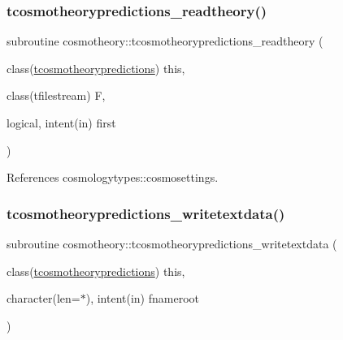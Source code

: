 \mbox{\label{namespacecosmotheory_aef1a661d37d1e130bced884acc9ea1bd}} 
\subsubsection{\texorpdfstring{tcosmotheorypredictions\+\_\+readtheory()}{tcosmotheorypredictions\_readtheory()}}
{\footnotesize\ttfamily subroutine cosmotheory\+::tcosmotheorypredictions\+\_\+readtheory (\begin{DoxyParamCaption}\item[{class(\mbox{\hyperlink{structcosmotheory_1_1tcosmotheorypredictions}{tcosmotheorypredictions}})}]{this,  }\item[{class(tfilestream)}]{F,  }\item[{logical, intent(in)}]{first }\end{DoxyParamCaption})\hspace{0.3cm}{\ttfamily [private]}}



References cosmologytypes\+::cosmosettings.

\mbox{\label{namespacecosmotheory_a10b74bbd756437c4b81eb4130afae354}} 
\subsubsection{\texorpdfstring{tcosmotheorypredictions\+\_\+writetextdata()}{tcosmotheorypredictions\_writetextdata()}}
{\footnotesize\ttfamily subroutine cosmotheory\+::tcosmotheorypredictions\+\_\+writetextdata (\begin{DoxyParamCaption}\item[{class(\mbox{\hyperlink{structcosmotheory_1_1tcosmotheorypredictions}{tcosmotheorypredictions}})}]{this,  }\item[{character(len=$\ast$), intent(in)}]{fnameroot }\end{DoxyParamCaption})\hspace{0.3cm}{\ttfamily [private]}}

